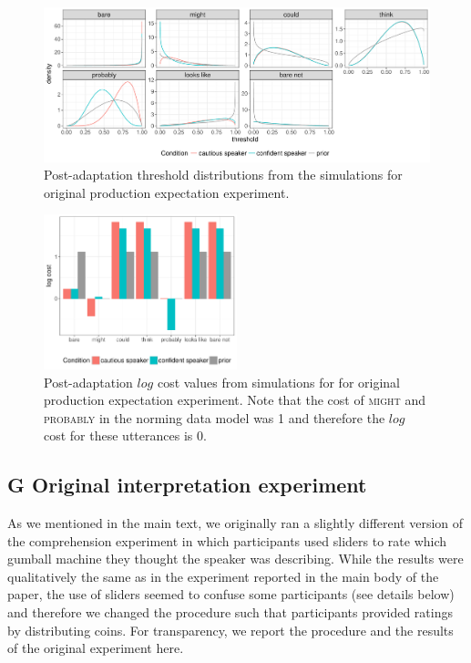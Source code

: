 \documentclass[man, floatsintext]{apa6}
\begin{document}
\begin{figure}[h!]
  \includegraphics[width=\textwidth]{plots/adaptation-posterior-thresholds.pdf}
  \caption{Post-adaptation threshold distributions from the simulations for original production expectation experiment. \label{fig:post-exposure-thresholds-original}}
\end{figure}

\begin{figure}[h!]
\center
  \includegraphics[width=0.5\textwidth]{plots/adaptation-posterior-costs.pdf}
  \caption{Post-adaptation $log$ cost values from simulations for for original production expectation experiment. Note that the cost of \textsc{might} and \textsc{probably} 
  in the norming data model was 1 and therefore the $log$ cost for these utterances is 0.  \label{fig:post-exposure-costs-original}}
\end{figure}

\pagebreak
\FloatBarrier



\subsection*{G Original interpretation experiment}

As we mentioned in the main text, we originally ran a slightly different version of the comprehension experiment in which participants used sliders to rate which gumball machine they thought the speaker was describing. While the results were qualitatively the same as in the experiment reported in the main body of the paper, the use of sliders seemed to confuse some participants (see details below) and therefore we changed the procedure such that participants provided ratings by distributing coins. For transparency, we report the 
procedure and the results of the original experiment here.
\end{document}
